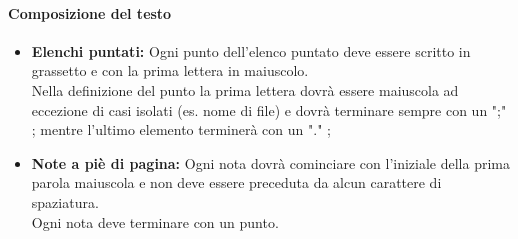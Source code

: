       \paragraph{Composizione del testo}
        \begin{itemize}
          \item \textbf{Elenchi puntati: }Ogni punto dell'elenco puntato deve essere scritto in grassetto e con la prima lettera in maiuscolo.\\
            Nella definizione del punto la prima lettera dovrà essere maiuscola ad eccezione di casi isolati (es. nome di file) e dovrà terminare sempre con un ";" ; mentre l'ultimo elemento terminerà con un "." ;
          \item \textbf{Note a piè di pagina: }Ogni nota dovrà cominciare con l’iniziale della prima parola maiuscola e non deve essere preceduta da alcun carattere di spaziatura.\\
            Ogni nota deve terminare con un punto.
        \end{itemize}
